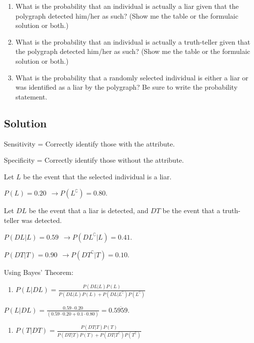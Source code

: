 \documentclass[]{article}
\providecommand{\tightlist}{%
  \setlength{\itemsep}{0pt}\setlength{\parskip}{0pt}}
\begin{document}
\begin{enumerate}
\def\labelenumi{\alph{enumi}.}
\item
  What is the probability that an individual is actually a liar given
  that the polygraph detected him/her as such? (Show me the table or the
  formulaic solution or both.)
\item
  What is the probability that an individual is actually a truth-teller
  given that the polygraph detected him/her as such? (Show me the table
  or the formulaic solution or both.)
\item
  What is the probability that a randomly selected individual is either
  a liar or was identified as a liar by the polygraph? Be sure to write
  the probability statement.
\end{enumerate}

\subsection{Solution}\label{solution-12}

Sensitivity = Correctly identify those with the attribute.

Specificity = Correctly identify those without the attribute.

Let \(L\) be the event that the selected individual is a liar.

\(P(L) = 0.20 \ \ \to P(L^{\complement}) = 0.80\).

Let \(DL\) be the event that a liar is detected, and \(DT\) be the event
that a truth-teller was detected.

\(P(DL|L) = 0.59 \ \ \to P(DL^{\complement}|L) = 0.41\).

\(P(DT|T) = 0.90 \ \ \to P(DT^{\complement}|T) = 0.10\).

Using Bayes' Theorem:

\begin{enumerate}
\def\labelenumi{\arabic{enumi})}
\tightlist
\item
  \(P(L|DL) = \frac{P(DL|L)P(L)}{P(DL|L)P(L) + P(DL|L^{\complement})P(L^{\complement})}\)
\end{enumerate}

\(P(L|DL) = \frac{0.59\cdot 0.20}{(0.59\cdot 0.20 + 0.1\cdot 0.80)} = 0.\overline{5959}\).

\begin{enumerate}
\def\labelenumi{\arabic{enumi})}
\setcounter{enumi}{1}
\tightlist
\item
  \(P(T|DT) = \frac{P(DT|T)P(T)}{P(DT|T)P(T) + P(DT|T^{\complement})P(T^{\complement})}\)
\end{enumerate}
\end{document}
